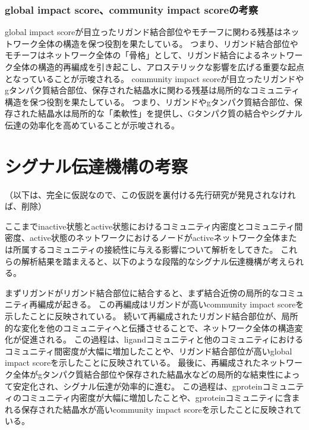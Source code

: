 \subsubsection{global impact score、community impact scoreの考察}

global impact scoreが目立ったリガンド結合部位やモチーフに関わる残基はネットワーク全体の構造を保つ役割を果たしている。
つまり、リガンド結合部位やモチーフはネットワーク全体の「骨格」として、リガンド結合によるネットワーク全体の構造的再編成を引き起こし、アロステリックな影響を広げる重要な起点となっていることが示唆される。
community impact scoreが目立ったリガンドやgタンパク質結合部位、保存された結晶水に関わる残基は局所的なコミュニティ構造を保つ役割を果たしている。
つまり、リガンドやgタンパク質結合部位、保存された結晶水は局所的な「柔軟性」を提供し、Gタンパク質の結合やシグナル伝達の効率化を高めていることが示唆される。


\section{シグナル伝達機構の考察}
（以下は、完全に仮説なので、この仮説を裏付ける先行研究が発見されなければ、削除）

ここまでinactive状態とactive状態におけるコミュニティ内密度とコミュニティ間密度、active状態のネットワークにおけるノードがactiveネットワーク全体または所属するコミュニティの接続性に与える影響について解析をしてきた。
これらの解析結果を踏まえると、以下のような段階的なシグナル伝達機構が考えられる。

まずリガンドがリガンド結合部位に結合すると、まず結合近傍の局所的なコミュニティ再編成が起きる。
この再編成はリガンドが高いcommunity impact scoreを示したことに反映されている。
続いて再編成されたリガンド結合部位が、局所的な変化を他のコミュニティへと伝播させることで、ネットワーク全体の構造変化が促進される。
この過程は、ligandコミュニティと他のコミュニティにおけるコミュニティ間密度が大幅に増加したことや、リガンド結合部位が高いglobal impact scoreを示したことに反映されている。
最後に、再編成されたネットワーク全体がgタンパク質結合部位や保存された結晶水などの局所的な結束性によって安定化され、シグナル伝達が効率的に進む。
この過程は、gproteinコミュニティのコミュニティ内密度が大幅に増加したことや、gproteinコミュニティに含まれる保存された結晶水が高いcommunity impact scoreを示したことに反映されている。